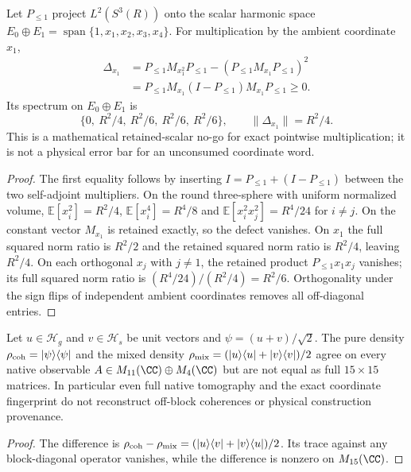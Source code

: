 \documentclass[11pt,a4paper]{article}
\begin{document}
\begin{proposition}
\label{p2f:prop:v264-sharp-scalar-compression-defect}
Let $P_{\le1}$ project $L^2(S^3(R))$ onto the scalar harmonic space
$E_0\oplus E_1=\operatorname{span}\{1,x_1,x_2,x_3,x_4\}$.
For multiplication by the ambient coordinate $x_1$,
\[
\begin{split}
\Delta_{x_1}&=P_{\le1}M_{x_1^2}P_{\le1}
   -(P_{\le1}M_{x_1}P_{\le1})^2\\
 &=P_{\le1}M_{x_1}(I-P_{\le1})M_{x_1}P_{\le1}\ge0.
\end{split}
\]
Its spectrum on $E_0\oplus E_1$ is
\[
 \boxed{\{0,\ R^2/4,\ R^2/6,\ R^2/6,\ R^2/6\}},
 \qquad\boxed{\|\Delta_{x_1}\|=R^2/4.}
\]
This is a mathematical retained-scalar no-go for exact pointwise
multiplication; it is not a physical error bar for an unconsumed
coordinate word.
\end{proposition}
\begin{proof}
The first equality follows by inserting $I=P_{\le1}+(I-P_{\le1})$
between the two self-adjoint multipliers. On the round three-sphere
with uniform normalized volume,
$\mathbb E[x_i^2]=R^2/4$,
$\mathbb E[x_i^4]=R^4/8$ and
$\mathbb E[x_i^2x_j^2]=R^4/24$ for $i\ne j$.
On the constant vector $M_{x_1}$ is retained exactly, so the defect
vanishes. On $x_1$ the full squared norm ratio is $R^2/2$ and the
retained squared norm ratio is $R^2/4$, leaving $R^2/4$.
On each orthogonal $x_j$ with $j\ne1$, the retained product
$P_{\le1}x_1x_j$ vanishes; its full squared norm ratio is
$(R^4/24)/(R^2/4)=R^2/6$. Orthogonality under the sign flips of
independent ambient coordinates removes all off-diagonal entries.
\end{proof}

\begin{proposition}
\label{p2f:prop:v264-native-state-nonconverse}
Let $u\in\mathcal H_g$ and $v\in\mathcal H_s$ be unit vectors and
$\psi=(u+v)/\sqrt2$. The pure density
$\rho_{\rm coh}=|\psi\rangle\langle\psi|$ and the mixed density
$\rho_{\rm mix}=(|u\rangle\langle u|+|v\rangle\langle v|)/2$
agree on every native observable $A\in M_{11}(\CC)\oplus M_4(\CC)$
but are not equal as full $15\times15$ matrices.
In particular even full native tomography and the exact coordinate
fingerprint do not reconstruct off-block coherences or physical
construction provenance.
\end{proposition}
\begin{proof}
The difference is
$\rho_{\rm coh}-\rho_{\rm mix}
=(|u\rangle\langle v|+|v\rangle\langle u|)/2$.
Its trace against any block-diagonal operator vanishes, while the
difference is nonzero on $M_{15}(\CC)$.
\end{proof}
\end{document}
